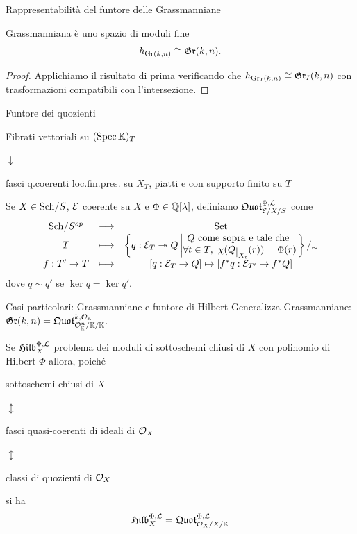 \documentclass[a4paper]{beamer}
\begin{document}
\begin{frame}{Rappresentabilit\`a del funtore delle Grassmanniane}
\begin{alertblock}{Grassmanniana \`e uno spazio di moduli fine}
\[h_{\mathrm{Gr}(k,n)}\cong \mathfrak{Gr}(k,n).\]
\end{alertblock}
\begin{proof}
Applichiamo il risultato di prima verificando che $h_{\mathrm{Gr}_I(k,n)}\cong \mathfrak{Gr}_I(k,n)$ con trasformazioni compatibili con l'intersezione.
\end{proof}
\end{frame}

\begin{frame}{Funtore dei quozienti}
\begin{center}
Fibrati vettoriali su $(\mathrm{Spec}\,\mathbb{K})_T$ 

$\downarrow$ 

fasci q.coerenti loc.fin.pres. su $X_T$, piatti e con supporto finito su $T$
\end{center}
\pause

Se $X\in{\mathrm{Sch}}/{S}$, $\mathcal{E}$ coerente su $X$ e $\Phi\in \mathbb{Q}[\lambda]$, definiamo $\mathfrak{Quot}^{\Phi,\mathcal{L}}_{\mathcal{E}/X/S}$ come
\[\functorDef{\Sch S\op}{\Set}{T}{\cpa{q:\Ec_T\onto Q\left| \emat{Q\text{ come sopra e tale che }\\\forall t\in T,\ \chi(Q\res{X_t}(r))=\Phi(r)}\right.}/_\sim}{f:T'\to T}{[q:\Ec_T\to Q]\mapsto [f^\ast q:\Ec_{T'}\to f^\ast Q]}\]
dove $q\sim q'$ se $\ker q=\ker q'$.
\end{frame}

\begin{frame}{Casi particolari: Grassmanniane e funtore di Hilbert}
Generalizza Grassmanniane: $\mathfrak{Gr}(k,n)=\mathfrak{Quot}^{k,\mathcal{O}_{\mathbb{K}}}_{\mathcal{O}_{\mathbb{K}}^n/\mathbb{K}/\mathbb{K}}$.\pause
\bigskip

Se $\mathfrak{Hilb}^{\Phi,\mathcal{L}}_X$ problema dei moduli di sottoschemi chiusi di $X$ con polinomio di Hilbert $\Phi$ allora, poich\'e
\begin{center}
sottoschemi chiusi di $X$ 

$\updownarrow$ 

fasci quasi-coerenti di ideali di $\mathcal{O}_X$ 

$\updownarrow$ 

classi di quozienti di $\mathcal{O}_X$
\end{center}
si ha
\[\mathfrak{Hilb}^{\Phi,\mathcal{L}}_X=\mathfrak{Quot}^{\Phi,\mathcal{L}}_{\mathcal{O}_X/X/\mathbb{K}}\]

\end{frame}
\end{document}
